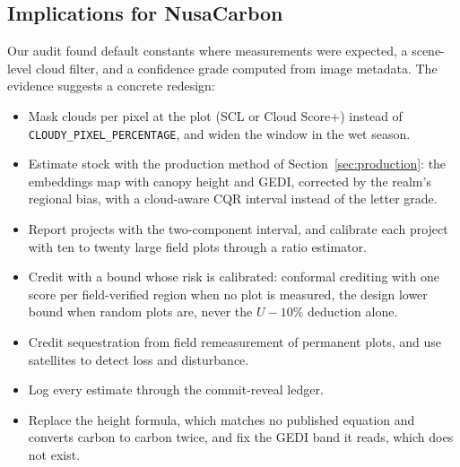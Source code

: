 \documentclass[conference,a4paper]{IEEEtran}
\begin{document}
\subsection{Implications for NusaCarbon}
Our audit found default constants where measurements were expected, a scene-level cloud filter, and a confidence grade computed from image metadata. The evidence suggests a concrete redesign:
\begin{itemize}
\item Mask clouds per pixel at the plot (SCL or Cloud Score+) instead of \texttt{CLOUDY\_PIXEL\_PERCENTAGE}, and widen the window in the wet season.
\item Estimate stock with the production method of Section~\ref{sec:production}: the embeddings map with canopy height and GEDI, corrected by the realm's regional bias, with a cloud-aware CQR interval instead of the letter grade.
\item Report projects with the two-component interval, and calibrate each project with ten to twenty large field plots through a ratio estimator.
\item Credit with a bound whose risk is calibrated: conformal crediting with one score per field-verified region when no plot is measured, the design lower bound when random plots are, never the $U-10\%$ deduction alone.
\item Credit sequestration from field remeasurement of permanent plots, and use satellites to detect loss and disturbance.
\item Log every estimate through the commit-reveal ledger.
\item Replace the height formula, which matches no published equation and converts carbon to carbon twice, and fix the GEDI band it reads, which does not exist.
\end{itemize}
\end{document}
